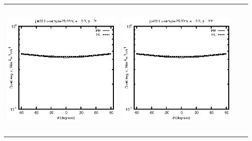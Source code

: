 \begin{tabular}{c c c c}
\includegraphics[height=7cm]{../eps/jok00_Lu_sample_25.00m_fwd.eps} &
\includegraphics[height=7cm]{../eps/jok00_Lu_sample_25.00m_cross.eps} \\
\end{tabular}

\pagebreak

